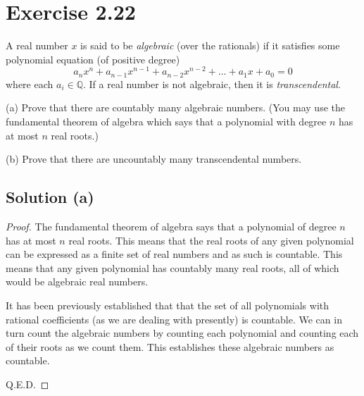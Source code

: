 \documentclass[12pt]{report}
\begin{document}
\pagebreak
\section{Exercise 2.22}
A real number $x$ is said to be \textit{algebraic} (over the rationals) if it satisfies some polynomial equation (of positive degree) 
\begin{equation*}
    a_n x^n + a_{n-1} x^{n-1} + a_{n-2} x^{n-2} + \dots + a_1 x + a_0 = 0 
\end{equation*}
where each $a_i \in \mathbb{Q}$. If a real number is not algebraic, then it is \textit{transcendental}. 

(a) Prove that there are countably many algebraic numbers. (You  may use the fundamental theorem of algebra which says that a polynomial with degree $n$ has at most $n$ real roots.) 

(b) Prove that there are uncountably many transcendental numbers. 

\subsection{Solution (a)}
\begin{proof}
    The fundamental theorem of algebra says that a polynomial of degree $n$ has at most $n$ real roots.
    This means that the real roots of any given polynomial can be expressed as a finite set of real numbers and as such is countable.
    This means that any given polynomial has countably many real roots, all of which would be algebraic real numbers.

    It has been previously established that that the set of all polynomials with rational coefficients (as we are dealing with presently) is countable.
    We can in turn count the algebraic numbers by counting each polynomial and counting each of their roots as we count them.
    This establishes these algebraic numbers as countable.

    Q.E.D.
\end{proof}
\end{document}
